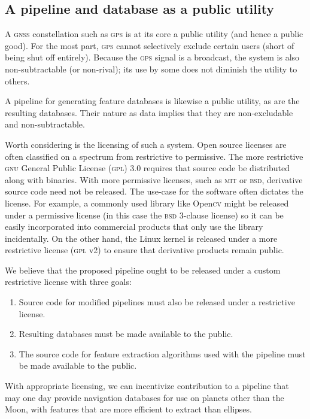 \documentclass[12pt]{article}
\begin{document}
\subsection{A pipeline and database as a public utility}
A \textsc{gnss} constellation such as \textsc{gps} is at its core a public utility (and hence a public good). For the most part, \textsc{gps} cannot selectively exclude certain users (short of being shut off entirely). Because the \textsc{gps} signal is a broadcast, the system is also non-subtractable (or non-rival); its use by some does not diminish the utility to others.

A pipeline for generating feature databases is likewise a public utility, as are the resulting databases. Their nature as data implies that they are non-excludable and non-subtractable. 

Worth considering is the licensing of such a system. Open source licenses are often classified on a spectrum from restrictive to permissive. The more restrictive \textsc{gnu} General Public License (\textsc{gpl}) 3.0 requires that source code be distributed along with binaries. With more permissive licenses, such as \textsc{mit} or \textsc{bsd}, derivative source code need not be released. The use-case for the software often dictates the license. For example, a commonly used library like Open\textsc{cv} might be released under a permissive license (in this case the \textsc{bsd} 3-clause license) so it can be easily incorporated into commercial products that only use the library incidentally. On the other hand, the Linux kernel is released under a more restrictive license (\textsc{gpl} v2) to ensure that derivative products remain public.

We believe that the proposed pipeline ought to be released under a custom restrictive license with three goals:
\begin{enumerate}
\item Source code for modified pipelines must also be released under a restrictive license.
\item Resulting databases must be made available to the public.
\item The source code for feature extraction algorithms used with the pipeline must be made available to the public.
\end{enumerate}
With appropriate licensing, we can incentivize contribution to a pipeline that may one day provide navigation databases for use on planets other than the Moon, with features that are more efficient to extract than ellipses.
\end{document}
